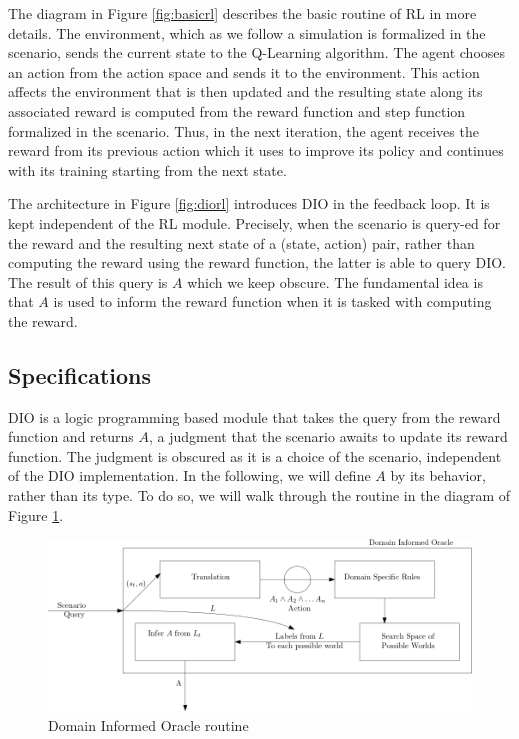 \documentclass[a4paper,11pt]{article}
\begin{document}
The diagram in Figure \ref{fig:basicrl} describes the basic routine of RL in more details. The environment, which as we follow a simulation is formalized in the scenario, sends the current state 
to the Q-Learning algorithm. The agent chooses an action from the action space and sends it to the environment. This action affects the environment that is then 
updated and the resulting state along its associated reward is computed from the reward function and step function formalized in the scenario. Thus, in the next iteration, the 
agent receives the reward from its previous action which it uses to improve its policy and continues with its training starting from the next state.  

\medskip 

The architecture in Figure \ref{fig:diorl} introduces DIO in the feedback loop. It is kept independent of the RL module. Precisely, when the scenario is query-ed for the reward and 
the resulting next state of a (state, action) pair, rather than computing the reward using the reward function, the latter is able to query DIO. The result of this query is $A$ which we keep 
obscure. The fundamental idea is that $A$ is used to inform the reward function when it is tasked with computing the reward. 

\subsection{Specifications} \label{scspecs}
DIO is a logic programming based module that takes the query from the reward function and returns $A$, a judgment that the scenario awaits to update its reward function. The judgment is obscured as it is a choice of the scenario, 
independent of the DIO implementation. In the following, we will define $A$ by its behavior, rather than its type. To do so, we will walk through the routine in the diagram of Figure \ref{fig:diospecs}.


\begin{figure}[H]
  \centering
  \includegraphics[scale=0.46]{diospecs.png}
  \caption{Domain Informed Oracle routine}
  \label{fig:diospecs}
\end{figure}
\end{document}
